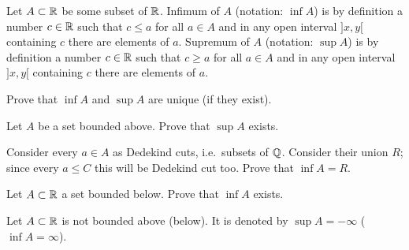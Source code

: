 \documentclass[12pt]{article}
\begin{document}
\begin{opredelenie} Let $A\subset {\mathbb R}$ be some subset of 
${\mathbb R}$. Infimum of $A$ (notation: $\inf A$) is by definition a number $c
\in {\mathbb R}$ such that $c \leq a$ for all $a\in A$ and in any open interval
$]x, y[$ containing $c$ there are elements of $a$. Supremum of $A$
(notation: $\sup A$) is by definition a number $c \in {\mathbb R}$ such that $c
\geq a$ for all $a\in A$ and in any open interval $]x, y[$ containing
$c$ there are elements of $a$.
\end{opredelenie}

\begin{zadacha} Prove that $\inf A$ and $\sup A$ are unique (if they
  exist).
\end{zadacha}

\begin{zadacha}[!] Let $A$ be a set bounded above. Prove that $\sup A$
 exists.
\end{zadacha}

\begin{ukazanie} Consider every $a\in A$ as Dedekind cuts,
i.e.\ subsets of ${\mathbb Q}$. Consider their union $R$; since every $a \leq C$
this will be Dedekind cut too. Prove that $\inf A = R$.
\end{ukazanie}

\begin{zadacha}[!] Let $A \subset {\mathbb R}$ a set bounded below.
Prove that $\inf A$ exists.
\end{zadacha}

\begin{zamechanie} Let $A\subset {\mathbb R}$ is not bounded above (below).
It is denoted by $\sup A = -\infty$ ($\inf A = \infty$).
\end{zamechanie}
\end{document}

